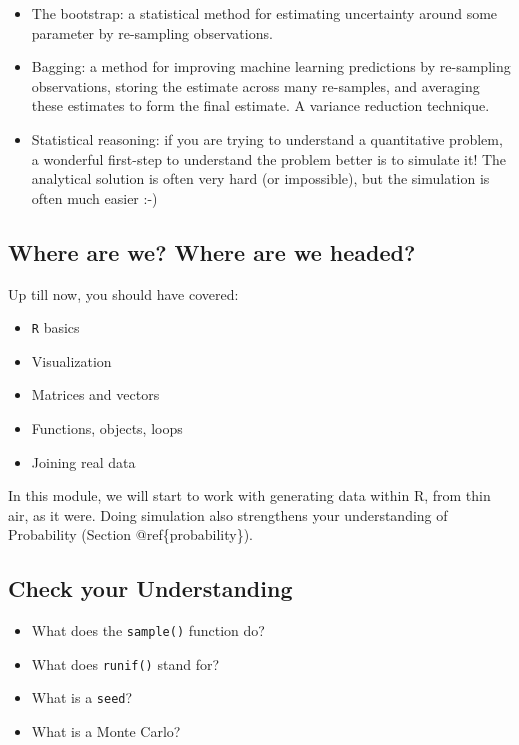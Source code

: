 \documentclass[]{book}
\newenvironment{Shaded}{\begin{snugshade}}{\end{snugshade}}
\providecommand{\tightlist}{%
  \setlength{\itemsep}{0pt}\setlength{\parskip}{0pt}}
\theoremstyle{definition}
\theoremstyle{definition}
\theoremstyle{definition}
\theoremstyle{remark}
\begin{document}
\begin{Shaded}
\begin{Highlighting}[]
\begin{Shaded}
\begin{Highlighting}[]
\begin{Shaded}
\begin{Highlighting}[]
\begin{itemize}
\tightlist
\item
  The bootstrap: a statistical method for estimating uncertainty around some parameter by re-sampling observations.
\item
  Bagging: a method for improving machine learning predictions by re-sampling observations, storing the estimate across many re-samples, and averaging these estimates to form the final estimate. A variance reduction technique.
\item
  Statistical reasoning: if you are trying to understand a quantitative problem, a wonderful first-step to understand the problem better is to simulate it! The analytical solution is often very hard (or impossible), but the simulation is often much easier :-)
\end{itemize}

\hypertarget{where-are-we-where-are-we-headed-5}{%
\subsection*{Where are we? Where are we headed?}\label{where-are-we-where-are-we-headed-5}}

Up till now, you should have covered:

\begin{itemize}
\tightlist
\item
  \texttt{R} basics
\item
  Visualization
\item
  Matrices and vectors
\item
  Functions, objects, loops
\item
  Joining real data
\end{itemize}

In this module, we will start to work with generating data within R, from thin air, as it were. Doing simulation also strengthens your understanding of Probability (Section @ref\{probability\}).

\hypertarget{check-your-understanding-2}{%
\subsection*{Check your Understanding}\label{check-your-understanding-2}}

\begin{itemize}
\tightlist
\item
  What does the \texttt{sample()} function do?
\item
  What does \texttt{runif()} stand for?
\item
  What is a \texttt{seed}?
\item
  What is a Monte Carlo?
\end{itemize}


\end{Highlighting}
\end{Shaded}
\end{Highlighting}
\end{Shaded}
\end{Highlighting}
\end{Shaded}
\end{document}
